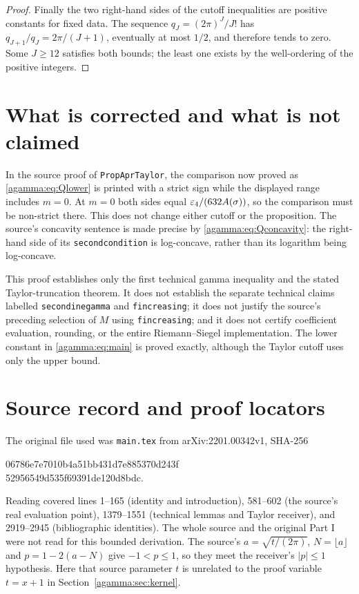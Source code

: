 \documentclass[11pt]{article}
\begin{document}
\begin{proof}
Finally the two right-hand sides of the cutoff inequalities are
positive constants for fixed data. The sequence $q_J=(2\pi)^J/J!$
has $q_{J+1}/q_J=2\pi/(J+1)$, eventually at most $1/2$, and
therefore tends to zero. Some $J\ge12$ satisfies both bounds;
the least one exists by the well-ordering of the positive integers.
\end{proof}

\section{What is corrected and what is not claimed}\label{agamma:sec:limits}
In the source proof of \texttt{PropAprTaylor}, the comparison now
proved as \eqref{agamma:eq:Qlower} is printed with a strict sign while the
displayed range includes $m=0$. At $m=0$ both sides equal
$\varepsilon_4/(632A(\sigma))$, so the comparison must be non-strict
there. This does not change either cutoff or the proposition.
The source's concavity sentence is made precise by
\eqref{agamma:eq:Qconcavity}: the right-hand side of its
\texttt{secondcondition} is log-concave, rather than its logarithm
being log-concave.

This proof establishes only the first technical gamma inequality
and the stated Taylor-truncation theorem. It does not establish
the separate technical claims labelled \texttt{secondinegamma}
and \texttt{fincreasing}; it does not justify the source's preceding
selection of $M$ using \texttt{fincreasing}; and it does not certify
coefficient evaluation, rounding, or the entire Riemann--Siegel
implementation. The lower constant in \eqref{agamma:eq:main} is proved
exactly, although the Taylor cutoff uses only the upper bound.

\section*{Source record and proof locators}
The original file used was \texttt{main.tex} from
arXiv:2201.00342v1, SHA-256
\begin{center}\small\ttfamily
06786e7e7010b4a51bb431d7e885370d243f\\
52956549d535f69391de120d8bdc.
\end{center}
Reading covered lines 1--165 (identity and introduction),
581--602 (the source's real evaluation point),
1379--1551 (technical lemmas and Taylor receiver), and
2919--2945 (bibliographic identities). The whole source and the
original Part I were not read for this bounded derivation.
The source's $a=\sqrt{t/(2\pi)}$, $N=\lfloor a\rfloor$ and
$p=1-2(a-N)$ give $-1<p\le1$, so they meet the receiver's
$|p|\le1$ hypothesis. Here that source parameter $t$ is unrelated
to the proof variable $t=x+1$ in Section~\ref{agamma:sec:kernel}.
\end{document}
